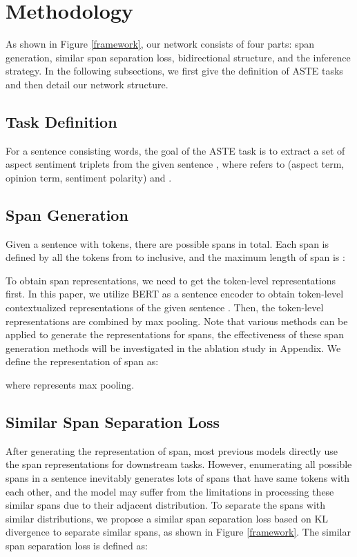 \documentclass[11pt]{article}
\begin{document}
\section{Methodology}
As shown in Figure \ref{framework}, our network consists of four parts: span generation, similar span separation loss, bidirectional structure, and the inference strategy. In the following subsections, we first give the definition of ASTE tasks and then detail our network structure.

\subsection{Task Definition} 
For a sentence  consisting  words, the goal of the ASTE task is to extract a set of aspect sentiment triplets  from the given sentence , where  refers to (aspect term, opinion term, sentiment polarity) and .

\subsection{Span Generation} \label{span generation}
Given a sentence  with  tokens, there are  possible spans in total. Each span  is defined by all the tokens from  to  inclusive, and the maximum length of span  is :



To obtain span representations, we need to get the token-level representations first. In this paper, we utilize BERT \cite{devlin2018bert} as a sentence encoder to obtain token-level contextualized representations  of the given sentence . Then, the token-level representations are combined by max pooling. Note that various methods can be applied to generate the representations for spans, the effectiveness of these span generation methods will be investigated in the ablation study in Appendix. We define the representation of span  as:

where  represents max pooling.


\subsection{Similar Span Separation Loss}
After generating the representation of span, most previous models directly use the span representations for downstream tasks. However, enumerating all possible spans in a sentence inevitably generates lots of spans that have same tokens with each other, and the model may suffer from the limitations in processing these similar spans due to their adjacent distribution. To separate the spans with similar distributions, we propose a similar span separation loss based on KL divergence to separate similar spans, as shown in Figure \ref{framework}. The similar span separation loss is defined as:
\end{document}
